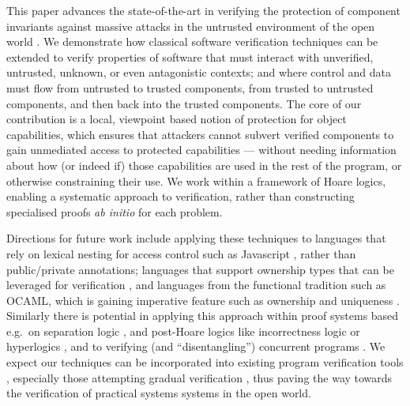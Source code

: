 
This paper advances the state-of-the-art in verifying the protection
of component invariants against massive
attacks \cite{massive-attack-protection} in the untrusted environment
of the open world \cite{baresi2006toward,swapsies}.
%
We demonstrate how classical software verification techniques
can be extended to verify properties of software that must
interact with unverified, untrusted, unknown, or even antagonistic
contexts; and where control and data must flow from untrusted to
trusted components, from trusted to untrusted components, and then
back into the trusted components.
%
The core of our contribution is a local, viewpoint based notion of
protection for object capabilities, which ensures that attackers
cannot subvert verified components to gain unmediated access to
protected capabilities --- without needing information about how (or
indeed if) those capabilities are used in the rest of the program, or
otherwise constraining their use.  We work within a framework of Hoare
logics, enabling a systematic approach to
verification, rather than constructing specialised proofs \textit{ab
initio} for each problem. 


Directions for future work include applying these techniques to
languages that rely on lexical nesting for access
control such as Javascript \cite{ooToSecurity},
rather than public/private annotations;
languages that support ownership types that can be leveraged for
verification
\cite{RustHornBelt-pldi2022,verus-oopsla2023},
and languages from the
functional tradition such as OCAML, which is gaining imperative
feature such as ownership and uniqueness \cite{funk-ownership2024,ocaml-ownership-icfp2024}. 
%
Similarly there is potential in applying this approach within
proof systems based e.g.\ on separation logic \cite{cerise-jacm2024},
and post-Hoare logics like incorrectness logic \cite{IncorrectnessLogic} or
hyperlogics \cite{compositional-hypersafety-oopsla2022,hyper-hoare-pldi2024},
and to verifying (and ``disentangling'') concurrent programs \cite{seplog-disentanglelment-popl2024}.
%
We expect our techniques can be incorporated into existing program
verification tools \cite{Cok2022}, especially those attempting
gradual verification \cite{gradual-verification-popl2024},
thus paving the way towards the verification of
practical systems systems in the open world.






